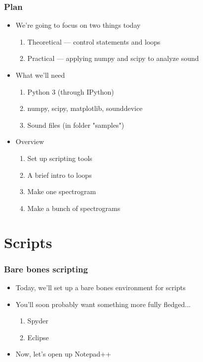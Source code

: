 \documentclass{beamer}\usepackage[]{graphicx}\usepackage[]{color}
\begin{document}
\begin{frame}
\frametitle{Plan}
\begin{itemize}
	\item We're going to focus on two things today

	\begin{enumerate}
		\item Theoretical --- control statements and loops

		\item Practical --- applying numpy and scipy to analyze sound 
	\end{enumerate}

	\item What we'll need
	\begin{enumerate}
		\item Python 3 (through IPython)

		\item numpy, scipy, matplotlib, sounddevice

		\item Sound files (in folder "samples") 
	\end{enumerate}

	\item Overview
	\begin{enumerate}
		\item Set up scripting tools

		\item A brief intro to loops

		\item Make one spectrogram

		\item Make a bunch of spectrograms
	\end{enumerate}
\end{itemize}
\end{frame}

\section{Scripts}

\begin{frame}
\frametitle{Bare bones scripting}
\begin{itemize}
	\item Today, we'll set up a bare bones environment for scripts

	\item You'll soon probably want something more fully fledged...
	\begin{enumerate}
		\item Spyder

		\item Eclipse
	\end{enumerate}

	\item Now, let's open up Notepad++
\end{itemize}
\end{frame}
\end{document}
